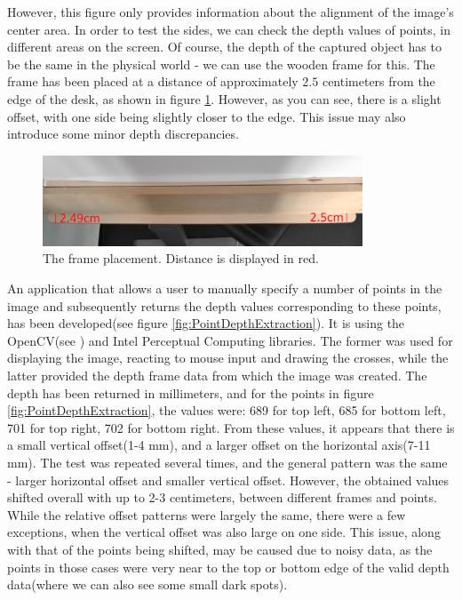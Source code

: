 \documentclass[]{article}
\begin{document}
 However, this figure only provides information about the alignment of the image's center area. In order to test the sides, we can check the depth values of points, in different areas on the screen. Of course, the depth of the captured object has to be the same in the physical world - we can use the wooden frame for this. The frame has been placed at a distance of approximately $2.5$ centimeters from the edge of the desk, as shown in figure \ref{fig:FramePlacement}. However, as you can see, there is a slight offset, with one side being slightly closer to the edge. This issue may also introduce some minor depth discrepancies. 
 
 \begin{figure}[!hbtp]
     \centering
     \includegraphics[width=0.85\textwidth]{figures/FramePlacementCM.jpg}
     \caption{The frame placement. Distance is displayed in red.}
     \label{fig:FramePlacement}
 \end{figure}
 
An application that allows a user to manually specify a number of points in the image and subsequently returns the depth values corresponding to these points, has been developed(see figure \ref{fig:PointDepthExtraction}). It is using the OpenCV(see \cite{opencv}) and Intel Perceptual Computing libraries. The former was used for displaying the image, reacting to mouse input and drawing the crosses, while the latter provided the depth frame data from which the image was created. The depth has been returned in millimeters, and for the points in figure \ref{fig:PointDepthExtraction}, the values were: 689 for top left, 685 for bottom left, 701 for top right, 702 for bottom right. From these values, it appears that there is a small vertical offset(1-4 mm), and a larger offset on the horizontal axis(7-11 mm). The test was repeated several times, and the general pattern was the same - larger horizontal offset and smaller vertical offset. However, the obtained values shifted overall with up to 2-3 centimeters, between different frames and points. While the relative offset patterns were largely the same, there were a few exceptions, when the vertical offset was also large on one side. This issue, along with that of the points being shifted, may be caused due to noisy data, as the points in those cases were very near to the top or bottom edge of the valid depth data(where we can also see some small dark spots).
 
\end{document}
